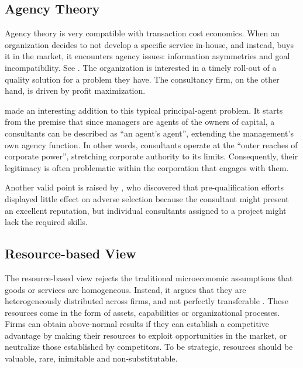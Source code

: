 \documentclass[12pt]{article}
\begin{document}
\hypertarget{agency-theory}{%
\subsection{Agency Theory}\label{agency-theory}}

Agency theory is very compatible with transaction cost economics. When
an organization decides to not develop a specific service in-house, and
instead, buys it in the market, it encounters agency issues: information
asymmetries and goal incompatibility. See \citet{shapiro2005}. The
organization is interested in a timely roll-out of a quality solution
for a problem they have. The consultancy firm, on the other hand, is
driven by profit maximization.

\citet{fincham2002} made an interesting addition to this typical
principal-agent problem. It starts from the premise that since managers
are agents of the owners of capital, a consultants can be described as
``an agent's agent'', extending the management's own agency function. In
other words, consultants operate at the ``outer reaches of corporate
power'', stretching corporate authority to its limits. Consequently,
their legitimacy is often problematic within the corporation that
engages with them.

Another valid point is raised by \citet[23]{basu2011} , who discovered
that pre-qualification efforts displayed little effect on adverse
selection because the consultant might present an excellent reputation,
but individual consultants assigned to a project might lack the required
skills.

\hypertarget{resource-based-view}{%
\subsection{Resource-based View}\label{resource-based-view}}

The resource-based view rejects the traditional microeconomic
assumptions that goods or services are homogeneous. Instead, it argues
that they are heterogeneously distributed across firms, and not
perfectly transferable \citet[392]{watjatrakul2005}. These resources
come in the form of assets, capabilities or organizational processes.
Firms can obtain above-normal results if they can establish a
competitive advantage by making their resources to exploit opportunities
in the market, or neutralize those established by competitors. To be
strategic, resources should be valuable, rare, inimitable and
non-substitutable.
\end{document}
